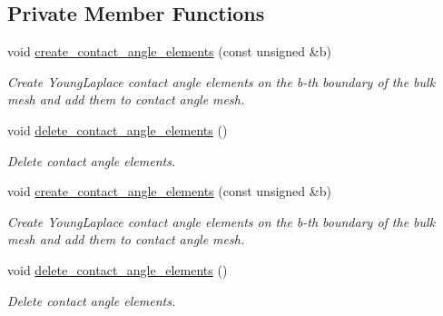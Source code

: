 \subsection*{Private Member Functions}
\begin{DoxyCompactItemize}
\item 
void \hyperlink{classRefineableYoungLaplaceProblem_a00d1304e030120e76d9f316dd4053116}{create\+\_\+contact\+\_\+angle\+\_\+elements} (const unsigned \&b)
\begin{DoxyCompactList}\small\item\em Create Young\+Laplace contact angle elements on the b-\/th boundary of the bulk mesh and add them to contact angle mesh. \end{DoxyCompactList}\item 
void \hyperlink{classRefineableYoungLaplaceProblem_aaa270ba8da395897a5a99d052f076e0c}{delete\+\_\+contact\+\_\+angle\+\_\+elements} ()
\begin{DoxyCompactList}\small\item\em Delete contact angle elements. \end{DoxyCompactList}\item 
void \hyperlink{classRefineableYoungLaplaceProblem_a00d1304e030120e76d9f316dd4053116}{create\+\_\+contact\+\_\+angle\+\_\+elements} (const unsigned \&b)
\begin{DoxyCompactList}\small\item\em Create Young\+Laplace contact angle elements on the b-\/th boundary of the bulk mesh and add them to contact angle mesh. \end{DoxyCompactList}\item 
void \hyperlink{classRefineableYoungLaplaceProblem_aaa270ba8da395897a5a99d052f076e0c}{delete\+\_\+contact\+\_\+angle\+\_\+elements} ()
\begin{DoxyCompactList}\small\item\em Delete contact angle elements. \end{DoxyCompactList}\end{DoxyCompactItemize}
